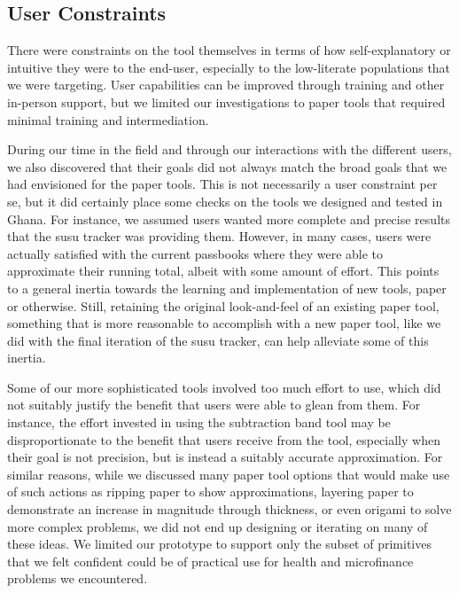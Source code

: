 \documentclass{sig-alternate}
\begin{document}
\subsection {User Constraints}

There were constraints on the tool themselves in terms of how self-explanatory or intuitive they were to the end-user, especially to the low-literate populations that we were targeting. User capabilities can be improved through training and other in-person support, but we limited our investigations to paper tools that required minimal training and intermediation.

During our time in the field and through our interactions with the different users, we also discovered that their goals did not always match the broad goals that we had envisioned for the paper tools. This is not necessarily a user constraint per se, but it did certainly place some checks on the tools we designed and tested in Ghana. For instance, we assumed users wanted more complete and precise results that the susu tracker was providing them. However, in many cases, users were actually satisfied with the current passbooks where they were able to approximate their running total, albeit with some amount of effort. This points to a general inertia towards the learning and implementation of new tools, paper or otherwise. Still, retaining the original look-and-feel of an existing paper tool, something that is more reasonable to accomplish with a new paper tool, like we did with the final iteration of the susu tracker, can help alleviate some of this inertia.

Some of our more sophisticated tools involved too much effort to use, which did not suitably justify the benefit that users were able to glean from them. For instance, the effort invested in using the subtraction band tool may be disproportionate to the benefit that users receive from the tool, especially when their goal is not precision, but is instead a suitably accurate approximation.
For similar reasons, while we discussed many paper tool options that would make use of such actions as ripping paper to show approximations, layering paper to demonstrate an increase in magnitude through thickness, or even origami to solve more complex problems, we did not end up designing or iterating on many of these ideas. We limited our \nifty prototype to support only the subset of primitives that we felt confident could be of practical use for health and microfinance problems we encountered.

\end{document}
